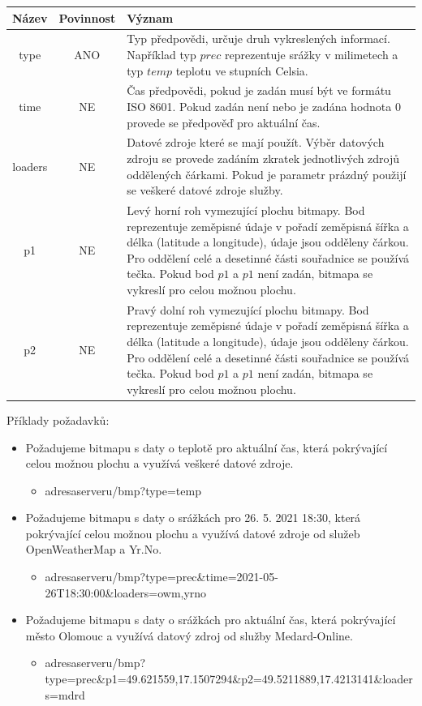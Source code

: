 \documentclass[czech,bachelor,dept460,male,csharp,cpdeclaration]{diploma}
\begin{document}
	\begin{center}
		\begin{tabular}{c c p{13cm}}
			Název & Povinnost & Význam \\
			\midrule
			type & ANO & Typ předpovědi, určuje druh vykreslených informací. Například typ $prec$ reprezentuje srážky v milimetech a typ $temp$ teplotu ve stupních Celsia.\\ 
   			time & NE & Čas předpovědi, pokud je zadán musí být ve formátu ISO 8601. Pokud zadán není nebo je zadána hodnota 0  provede se předpověď pro aktuální čas.\\ 
   			loaders & NE & Datové zdroje které se mají použít. Výběr datových zdroju se provede zadáním zkratek jednotlivých zdrojů oddělených čárkami. Pokud je parametr prázdný použijí se veškeré datové zdroje služby. \\ 
   			p1 & NE & Levý horní roh vymezující plochu bitmapy. Bod reprezentuje zeměpisné údaje v pořadí zeměpisná šířka a délka (latitude a longitude), údaje jsou odděleny čárkou. Pro oddělení celé a desetinné části souřadnice se používá tečka. Pokud bod $p1$ a $p1$ není zadán, bitmapa se vykreslí pro celou možnou plochu.\\
   			p2 & NE & Pravý dolní roh vymezující plochu bitmapy. Bod reprezentuje zeměpisné údaje v pořadí zeměpisná šířka a délka (latitude a longitude), údaje jsou odděleny čárkou. Pro oddělení celé a desetinné části souřadnice se používá tečka. Pokud bod $p1$ a $p1$ není zadán, bitmapa se vykreslí pro celou možnou plochu.\\
		\end{tabular}
	\end{center}
	
	Příklady požadavků:
	\begin{itemize}
		\item Požadujeme bitmapu s daty o teplotě pro aktuální čas, která pokrývající celou možnou plochu a využívá veškeré datové zdroje.
		\begin{itemize}
			\item adresaserveru/bmp?type=temp
		\end{itemize}
		\item Požadujeme bitmapu s daty o srážkách pro 26. 5. 2021 18:30, která pokrývající celou možnou plochu a využívá datové zdroje od služeb OpenWeatherMap a Yr.No.
		\begin{itemize}
			\item adresaserveru/bmp?type=prec\&time=2021-05-26T18:30:00\&loaders=owm,yrno
		\end{itemize}
		\item Požadujeme bitmapu s daty o srážkách pro aktuální čas, která pokrývající město Olomouc a využívá datový zdroj od služby Medard-Online.
		\begin{itemize}
			\item adresaserveru/bmp?type=prec\&p1=49.621559,17.1507294\&p2=49.5211889,17.4213141\&loaders=mdrd
		\end{itemize}
	\end{itemize}
\end{document}
